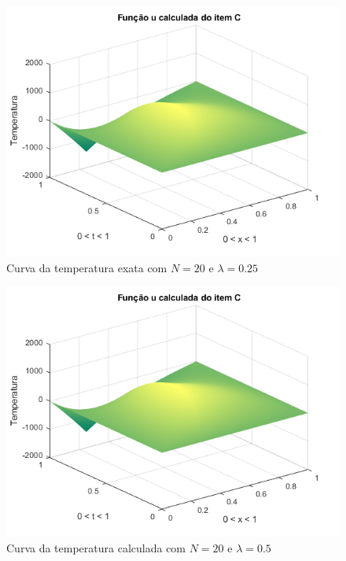 \documentclass[12pt]{article}
\begin{document}
\begin{spacing}{1.5}
\begin{figure}
    \centering
    \includegraphics[width=0.8\linewidth]{Primeira_Tarefa/ItemC/n20_lambda0-25_calc.png}
    \caption{Curva da temperatura exata com $N=20$ e $\lambda=0.25$}
    \label{fig:C_n20lambda0-25_exata}
\end{figure}
\begin{figure}
    \centering
    \includegraphics[width=0.8\linewidth]{Primeira_Tarefa/ItemC/n20_lambda0-5_calc.png}
    \caption{Curva da temperatura calculada com $N=20$ e $\lambda=0.5$}
    \label{fig:C_n20lambda0-5_calc}
\end{figure}



\end{spacing}
\end{document}
